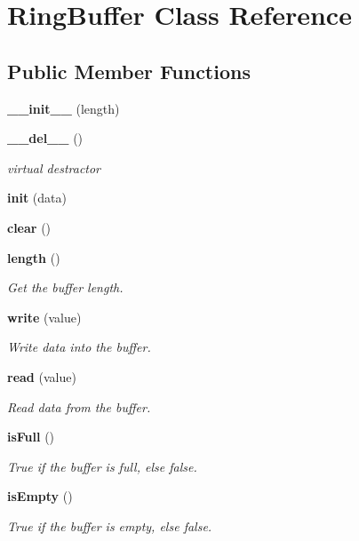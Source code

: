 \section{Ring\-Buffer Class Reference}
\label{classRingBuffer}
\subsection*{Public Member Functions}
\begin{CompactItemize}
\item 
{\bf \_\-\_\-init\_\-\_\-} (length)
\item 
{\bf \_\-\_\-del\_\-\_\-} ()
\begin{CompactList}\small\item\em virtual destractor \item\end{CompactList}\item 
{\bf init} (data)
\item 
{\bf clear} ()
\item 
{\bf length} ()
\begin{CompactList}\small\item\em Get the buffer length. \item\end{CompactList}\item 
{\bf write} (value)
\begin{CompactList}\small\item\em Write data into the buffer. \item\end{CompactList}\item 
{\bf read} (value)
\begin{CompactList}\small\item\em Read data from the buffer. \item\end{CompactList}\item 
{\bf is\-Full} ()
\begin{CompactList}\small\item\em True if the buffer is full, else false. \item\end{CompactList}\item 
{\bf is\-Empty} ()
\begin{CompactList}\small\item\em True if the buffer is empty, else false. \item\end{CompactList}\item 

\end{CompactItemize}
